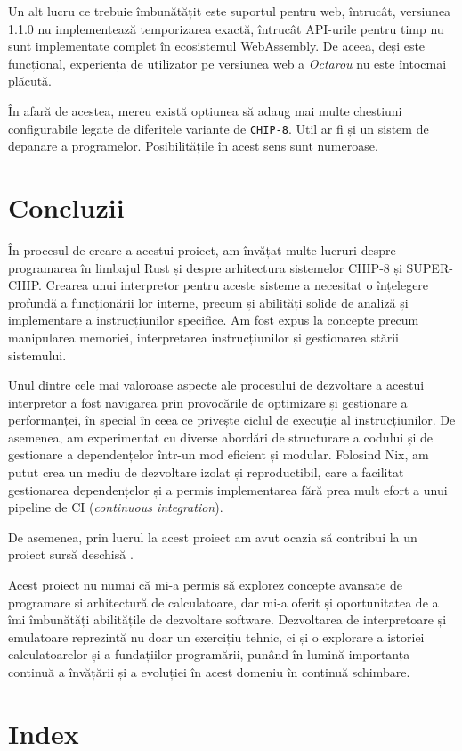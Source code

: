 \documentclass[a4paper]{article}
\begin{document}
Un alt lucru ce trebuie îmbunătățit este suportul pentru web, întrucât, versiunea 1.1.0 nu implementează temporizarea exactă, întrucât API-urile
pentru timp nu sunt implementate complet în ecosistemul WebAssembly. De aceea, deși este funcțional, experiența de utilizator pe versiunea web a
\textit{Octarou} nu este întocmai plăcută.

În afară de acestea, mereu există opțiunea să adaug mai multe chestiuni configurabile legate de diferitele variante de \texttt{CHIP-8}.
Util ar fi și un sistem de depanare a programelor. Posibilitățile în acest sens sunt numeroase.

\section{Concluzii}
În procesul de creare a acestui proiect, am învățat multe lucruri despre programarea în limbajul Rust și despre arhitectura sistemelor
CHIP-8 și SUPER-CHIP. Crearea unui interpretor pentru aceste sisteme a necesitat o înțelegere profundă a funcționării lor interne, precum
și abilități solide de analiză și implementare a instrucțiunilor specifice. Am fost expus la concepte precum manipularea memoriei, interpretarea
instrucțiunilor și gestionarea stării sistemului.

Unul dintre cele mai valoroase aspecte ale procesului de dezvoltare a acestui interpretor a fost navigarea prin provocările de optimizare și
gestionare a performanței, în special în ceea ce privește ciclul de execuție al instrucțiunilor. De asemenea, am experimentat cu diverse
abordări de structurare a codului și de gestionare a dependențelor într-un mod eficient și modular. Folosind Nix, am putut crea un mediu de
dezvoltare izolat și reproductibil, care a facilitat gestionarea dependențelor și a permis implementarea fără prea mult efort a unui pipeline
de CI (\textit{continuous integration}).

De asemenea, prin lucrul la acest proiect am avut ocazia să contribui la un proiect sursă deschisă \cite{eguilog}.

Acest proiect nu numai că mi-a permis să explorez concepte avansate de programare și arhitectură de calculatoare, dar mi-a oferit și oportunitatea
de a îmi îmbunătăți abilitățile de dezvoltare software. Dezvoltarea de interpretoare și emulatoare reprezintă nu doar un
exercițiu tehnic, ci și o explorare a istoriei calculatoarelor și a fundațiilor programării, punând în lumină importanța continuă a învățării și
a evoluției în acest domeniu în continuă schimbare.

\newpage
\printbibliography[title=\section{Bibliografie}]

\section{Index}
\renewcommand\listoflistingscaption{Listinguri de cod sursă}
\listoflistings
\listoffigures
\end{document}
